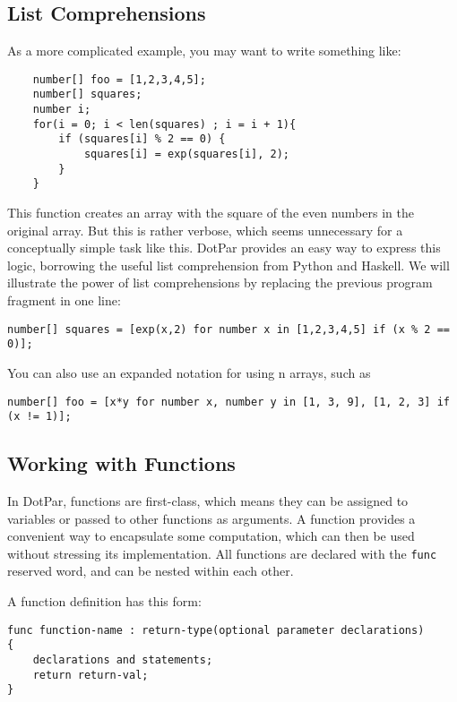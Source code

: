 \documentclass{article}
\begin{document}
\subsection{List Comprehensions}
As a more complicated example, you may want to write something like:

\begin{verbatim}
    number[] foo = [1,2,3,4,5];
    number[] squares;
    number i;
    for(i = 0; i < len(squares) ; i = i + 1){
        if (squares[i] % 2 == 0) {
            squares[i] = exp(squares[i], 2);
        }
    }
\end{verbatim}

This function creates an array with the square of the even numbers in the original array. But this is rather verbose, which seems unnecessary for a conceptually simple task like this. DotPar provides an easy way to express this logic, borrowing the useful list comprehension from Python and Haskell. We will illustrate the power of list comprehensions by replacing the previous program fragment in one line:

\begin{verbatim}
number[] squares = [exp(x,2) for number x in [1,2,3,4,5] if (x % 2 == 0)];
\end{verbatim}

You can also use an expanded notation for using n arrays, such as

\begin{verbatim}
number[] foo = [x*y for number x, number y in [1, 3, 9], [1, 2, 3] if (x != 1)];
\end{verbatim}

\subsection{Working with Functions}
In DotPar, functions are first-class, which means they can be assigned to variables or passed to other functions as arguments. A function provides a convenient way to encapsulate some computation, which can then be used without stressing its implementation. All functions are declared with the \verb!func! reserved word, and can be nested within each other.

A function definition has this form:

\begin{verbatim}
func function-name : return-type(optional parameter declarations)
{
    declarations and statements;
    return return-val;
}
\end{verbatim}
\end{document}
